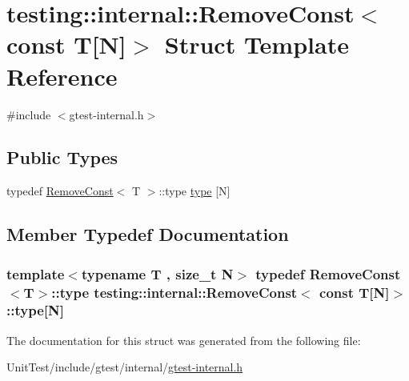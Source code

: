 \hypertarget{structtesting_1_1internal_1_1_remove_const_3_01const_01_t[_n]_4}{\section{testing\+:\+:internal\+:\+:Remove\+Const$<$ const T\mbox{[}N\mbox{]}$>$ Struct Template Reference}
\label{structtesting_1_1internal_1_1_remove_const_3_01const_01_t[_n]_4}
}


{\ttfamily \#include $<$gtest-\/internal.\+h$>$}

\subsection*{Public Types}
\begin{DoxyCompactItemize}
\item 
typedef \hyperlink{structtesting_1_1internal_1_1_remove_const}{Remove\+Const}$<$ T $>$\+::type \hyperlink{structtesting_1_1internal_1_1_remove_const_3_01const_01_t[_n]_4_ac976b53cb5d031a120fafbe790650068}{type} \mbox{[}N\mbox{]}
\end{DoxyCompactItemize}


\subsection{Member Typedef Documentation}
\hypertarget{structtesting_1_1internal_1_1_remove_const_3_01const_01_t[_n]_4_ac976b53cb5d031a120fafbe790650068}{
\subsubsection[{type}]{\setlength{\rightskip}{0pt plus 5cm}template$<$typename T , size\+\_\+t N$>$ typedef {\bf Remove\+Const}$<$T$>$\+::type {\bf testing\+::internal\+::\+Remove\+Const}$<$ const T\mbox{[}N\mbox{]}$>$\+::type\mbox{[}N\mbox{]}}}\label{structtesting_1_1internal_1_1_remove_const_3_01const_01_t[_n]_4_ac976b53cb5d031a120fafbe790650068}


The documentation for this struct was generated from the following file\+:\begin{DoxyCompactItemize}
\item 
Unit\+Test/include/gtest/internal/\hyperlink{gtest-internal_8h}{gtest-\/internal.\+h}\end{DoxyCompactItemize}
